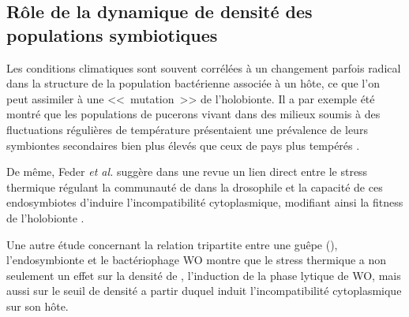 \subsection{Rôle de la dynamique de densité des populations symbiotiques}

Les conditions climatiques sont souvent corrélées à un changement parfois radical dans la structure de la population bactérienne associée à un hôte, ce que l'on peut assimiler à une <<~mutation~>> de l'holobionte.
Il a par exemple été montré que les populations de pucerons vivant dans des milieux soumis à des fluctuations régulières de température présentaient une prévalence de leurs symbiontes secondaires bien plus élevés que ceux de pays plus tempérés \cite{harmon2009}.

De même, Feder \textit{et al.} suggère dans une revue un lien direct entre le stress thermique régulant la communauté de  dans la drosophile et la capacité de ces endosymbiotes d'induire l'incompatibilité cytoplasmique, modifiant ainsi la fitness de l'holobionte \cite{feder1999}. 

Une autre étude \cite{bordenstein2011} concernant la relation tripartite entre une guêpe (), l'endosymbionte  et le bactériophage WO montre que le stress thermique a non seulement un effet sur la densité de , l'induction de la phase lytique de WO, mais aussi sur le seuil de densité a partir duquel  induit l'incompatibilité cytoplasmique sur son hôte.
